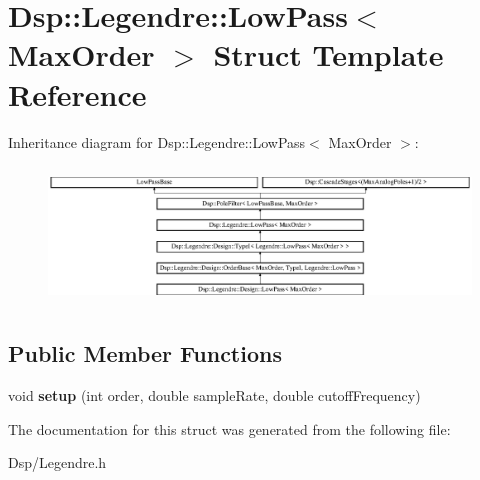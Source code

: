 \hypertarget{structDsp_1_1Legendre_1_1LowPass}{\section{Dsp\-:\-:Legendre\-:\-:Low\-Pass$<$ Max\-Order $>$ Struct Template Reference}
\label{structDsp_1_1Legendre_1_1LowPass}
}
Inheritance diagram for Dsp\-:\-:Legendre\-:\-:Low\-Pass$<$ Max\-Order $>$\-:\begin{figure}[H]
\begin{center}
\leavevmode
\includegraphics[height=3.684211cm]{structDsp_1_1Legendre_1_1LowPass}
\end{center}
\end{figure}
\subsection*{Public Member Functions}
\begin{DoxyCompactItemize}
\item 
\hypertarget{structDsp_1_1Legendre_1_1LowPass_a1244a26386b7d5bd780c0f174d5a6b30}{void {\bfseries setup} (int order, double sample\-Rate, double cutoff\-Frequency)}\label{structDsp_1_1Legendre_1_1LowPass_a1244a26386b7d5bd780c0f174d5a6b30}

\end{DoxyCompactItemize}


The documentation for this struct was generated from the following file\-:\begin{DoxyCompactItemize}
\item 
Dsp/Legendre.\-h\end{DoxyCompactItemize}
